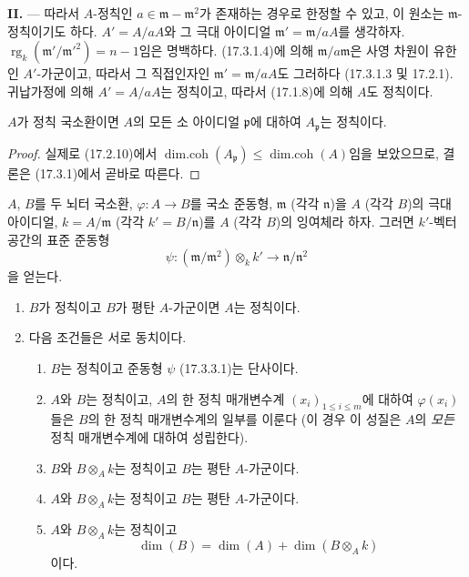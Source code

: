 \medskip\noindent\textbf{II.} --- 따라서
$A$-정칙인 $a\in\mathfrak{m}-\mathfrak{m}^2$가 존재하는 경우로
한정할 수 있고, 이 원소는 $\mathfrak{m}$-정칙이기도 하다.
$A'=A/aA$와 그 극대 아이디얼
$\mathfrak{m}'=\mathfrak{m}/aA$를 생각하자.
$\operatorname{rg}_k(\mathfrak{m}'/\mathfrak{m}'^2)=n-1$임은 명백하다.
(17.3.1.4)에 의해 $\mathfrak{m}/a\mathfrak{m}$은 사영 차원이 유한인
$A'$-가군이고, 따라서 그 직접인자인
$\mathfrak{m}'=\mathfrak{m}/aA$도 그러하다 (17.3.1.3 및 17.2.1).
귀납가정에 의해 $A'=A/aA$는 정칙이고, 따라서 (17.1.8)에 의해 $A$도
정칙이다.

\begin{corollary}[17.3.2]
\label{0.17.3.2-fr}
$A$가 정칙 국소환이면 $A$의 모든 소 아이디얼 $\mathfrak{p}$에 대하여
$A_{\mathfrak{p}}$는 정칙이다.
\end{corollary}

\begin{proof}
실제로 (17.2.10)에서
$\operatorname{dim.coh}(A_{\mathfrak{p}})\leq
\operatorname{dim.coh}(A)$임을 보았으므로, 결론은 (17.3.1)에서 곧바로
따른다.
\end{proof}

\begin{proposition}[17.3.3]
\label{0.17.3.3-fr}
$A$, $B$를 두 뇌터 국소환, $\varphi:A\longrightarrow B$를 국소
준동형, $\mathfrak{m}$ (각각 $\mathfrak{n}$)을 $A$ (각각 $B$)의 극대
아이디얼, $k=A/\mathfrak{m}$ (각각 $k'=B/\mathfrak{n}$)를 $A$
(각각 $B$)의 잉여체라 하자. 그러면 $k'$-벡터공간의 표준 준동형
\begin{equation}
\label{0.17.3.3.1-fr}
\tag{17.3.3.1}
  \psi:(\mathfrak{m}/\mathfrak{m}^2)\otimes_k k'
  \longrightarrow\mathfrak{n}/\mathfrak{n}^2
\end{equation}
을 얻는다.
\begin{enumerate}
  \item[\rm (i)] $B$가 정칙이고 $B$가 평탄 $A$-가군이면 $A$는
  정칙이다.
  \item[\rm (ii)] 다음 조건들은 서로 동치이다.
  \begin{enumerate}
    \item[\rm a)] $B$는 정칙이고 준동형 $\psi$ (17.3.3.1)는 단사이다.
    \item[\rm b)] $A$와 $B$는 정칙이고, $A$의 한 정칙 매개변수계
    $(x_i)_{1\leq i\leq m}$에 대하여 $\varphi(x_i)$들은 $B$의 한 정칙
    매개변수계의 일부를 이룬다 (이 경우 이 성질은 $A$의
    \emph{모든} 정칙 매개변수계에 대하여 성립한다).
    \item[\rm c)] $B$와 $B\otimes_A k$는 정칙이고 $B$는 평탄
    $A$-가군이다.
    \item[\rm d)] $A$와 $B\otimes_A k$는 정칙이고 $B$는 평탄
    $A$-가군이다.
    \item[\rm e)] $A$와 $B\otimes_A k$는 정칙이고
    \begin{equation}
    \label{0.17.3.3.2-fr}
    \tag{17.3.3.2}
      \dim(B)=\dim(A)+\dim(B\otimes_A k)
    \end{equation}
    이다.
  \end{enumerate}
\end{enumerate}
\end{proposition}

